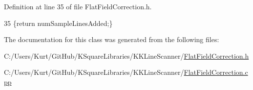 Definition at line 35 of file Flat\+Field\+Correction.\+h.


\begin{DoxyCode}
35 \{\textcolor{keywordflow}{return} numSampleLinesAdded;\}
\end{DoxyCode}


The documentation for this class was generated from the following files\+:\begin{DoxyCompactItemize}
\item 
C\+:/\+Users/\+Kurt/\+Git\+Hub/\+K\+Square\+Libraries/\+K\+K\+Line\+Scanner/\hyperlink{_flat_field_correction_8h}{Flat\+Field\+Correction.\+h}\item 
C\+:/\+Users/\+Kurt/\+Git\+Hub/\+K\+Square\+Libraries/\+K\+K\+Line\+Scanner/\hyperlink{_flat_field_correction_8cpp}{Flat\+Field\+Correction.\+cpp}\end{DoxyCompactItemize}
